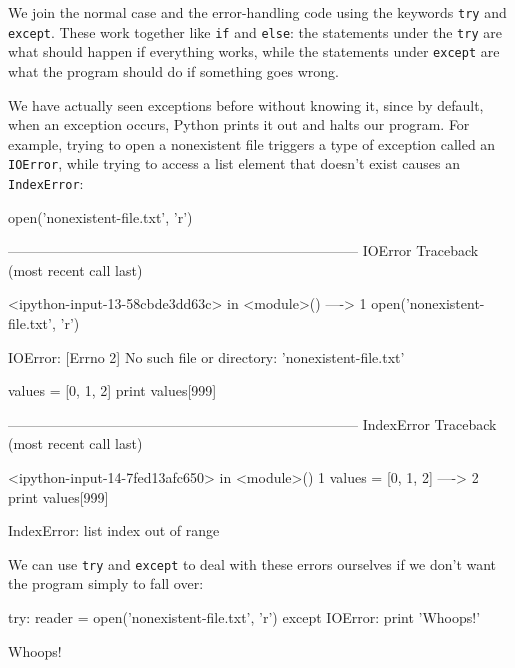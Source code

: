 We join the normal case and the error-handling code using the keywords
\texttt{try} and \texttt{except}. These work together like \texttt{if}
and \texttt{else}: the statements under the \texttt{try} are what should
happen if everything works, while the statements under \texttt{except}
are what the program should do if something goes wrong.

We have actually seen exceptions before without knowing it, since by
default, when an exception occurs, Python prints it out and halts our
program. For example, trying to open a nonexistent file triggers a type
of exception called an \texttt{IOError}, while trying to access a list
element that doesn't exist causes an \texttt{IndexError}:

\begin{VerbIn}
open('nonexistent-file.txt', 'r')
\end{VerbIn}

\begin{VerbErr}
---------------------------------------------------------------------------
IOError                                   Traceback (most recent call last)

<ipython-input-13-58cbde3dd63c> in <module>()
----> 1 open('nonexistent-file.txt', 'r')

IOError: [Errno 2] No such file or directory: 'nonexistent-file.txt'
\end{VerbErr}

\begin{VerbIn}
values = [0, 1, 2]
print values[999]
\end{VerbIn}

\begin{VerbErr}
---------------------------------------------------------------------------
IndexError                                Traceback (most recent call last)

<ipython-input-14-7fed13afc650> in <module>()
1 values = [0, 1, 2]
----> 2 print values[999]

IndexError: list index out of range
\end{VerbErr}

We can use \texttt{try} and \texttt{except} to deal with these errors
ourselves if we don't want the program simply to fall over:

\begin{VerbIn}
try:
    reader = open('nonexistent-file.txt', 'r')
except IOError:
    print 'Whoops!'
\end{VerbIn}

\begin{VerbOut}
Whoops!
\end{VerbOut}


